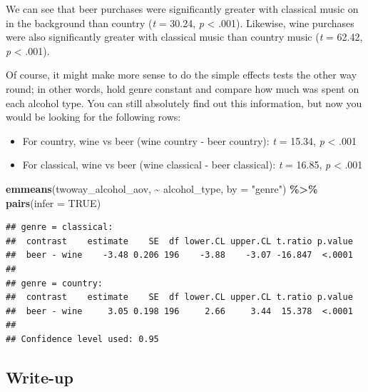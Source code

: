 \documentclass[
]{book}
\newenvironment{Shaded}{\begin{snugshade}}{\end{snugshade}}
\newcommand{\AttributeTok}[1]{\textcolor[rgb]{0.13,0.29,0.53}{#1}}
\newcommand{\ConstantTok}[1]{\textcolor[rgb]{0.56,0.35,0.01}{#1}}
\newcommand{\FunctionTok}[1]{\textcolor[rgb]{0.13,0.29,0.53}{\textbf{#1}}}
\newcommand{\NormalTok}[1]{#1}
\newcommand{\SpecialCharTok}[1]{\textcolor[rgb]{0.81,0.36,0.00}{\textbf{#1}}}
\newcommand{\StringTok}[1]{\textcolor[rgb]{0.31,0.60,0.02}{#1}}
\providecommand{\tightlist}{%
  \setlength{\itemsep}{0pt}\setlength{\parskip}{0pt}}
\begin{document}
We can see that beer purchases were significantly greater with classical music on in the background than country (\emph{t} = 30.24, \emph{p} \textless{} .001). Likewise, wine purchases were also significantly greater with classical music than country music (\emph{t} = 62.42, \emph{p} \textless{} .001).

Of course, it might make more sense to do the simple effects tests the other way round; in other words, hold genre constant and compare how much was spent on each alcohol type. You can still absolutely find out this information, but now you would be looking for the following rows:

\begin{itemize}
\tightlist
\item
  For country, wine vs beer (wine country - beer country): \emph{t} = 15.34, \emph{p} \textless{} .001
\item
  For classical, wine vs beer (wine classical - beer classical): \emph{t} = 16.85, \emph{p} \textless{} .001
\end{itemize}

\begin{Shaded}
\begin{Highlighting}[]
\FunctionTok{emmeans}\NormalTok{(twoway\_alcohol\_aov, }\SpecialCharTok{\textasciitilde{}}\NormalTok{ alcohol\_type, }\AttributeTok{by =} \StringTok{"genre"}\NormalTok{) }\SpecialCharTok{\%\textgreater{}\%}
  \FunctionTok{pairs}\NormalTok{(}\AttributeTok{infer =} \ConstantTok{TRUE}\NormalTok{) }
\end{Highlighting}
\end{Shaded}

\begin{verbatim}
## genre = classical:
##  contrast    estimate    SE  df lower.CL upper.CL t.ratio p.value
##  beer - wine    -3.48 0.206 196    -3.88    -3.07 -16.847  <.0001
## 
## genre = country:
##  contrast    estimate    SE  df lower.CL upper.CL t.ratio p.value
##  beer - wine     3.05 0.198 196     2.66     3.44  15.378  <.0001
## 
## Confidence level used: 0.95
\end{verbatim}

\hypertarget{write-up}{%
\subsection{Write-up}\label{write-up}}
\end{document}
